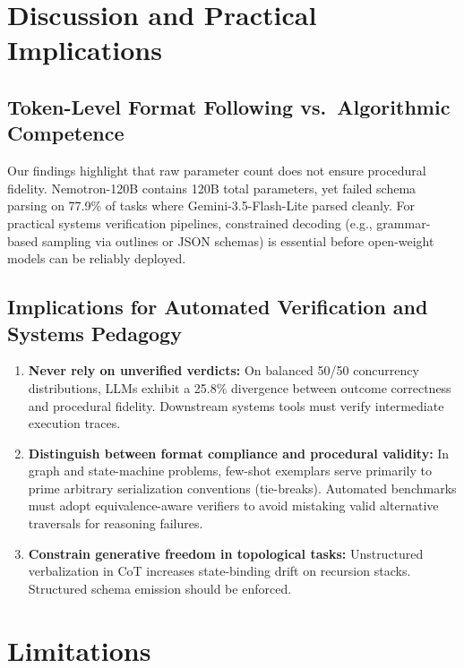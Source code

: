 \documentclass[conference]{IEEEtran}
\begin{document}
\section{Discussion and Practical Implications}
\label{sec:discussion}

\subsection{Token-Level Format Following vs.\ Algorithmic Competence}

Our findings highlight that raw parameter count does not ensure procedural fidelity.
Nemotron-120B contains 120B total parameters, yet failed schema parsing on 77.9\% of
tasks where Gemini-3.5-Flash-Lite parsed cleanly. For practical systems verification
pipelines, constrained decoding (e.g., grammar-based sampling via outlines or JSON
schemas) is essential before open-weight models can be reliably deployed.

\subsection{Implications for Automated Verification and Systems Pedagogy}

\begin{enumerate}
\item \textbf{Never rely on unverified verdicts:} On balanced 50/50 concurrency
  distributions, LLMs exhibit a 25.8\% divergence between outcome correctness and
  procedural fidelity. Downstream systems tools must verify intermediate execution traces.
\item \textbf{Distinguish between format compliance and procedural validity:} In graph
  and state-machine problems, few-shot exemplars serve primarily to prime arbitrary
  serialization conventions (tie-breaks). Automated benchmarks must adopt equivalence-aware
  verifiers to avoid mistaking valid alternative traversals for reasoning failures.
\item \textbf{Constrain generative freedom in topological tasks:} Unstructured
  verbalization in CoT increases state-binding drift on recursion stacks. Structured
  schema emission should be enforced.
\end{enumerate}

\section{Limitations}
\label{sec:limitations}
\end{document}
